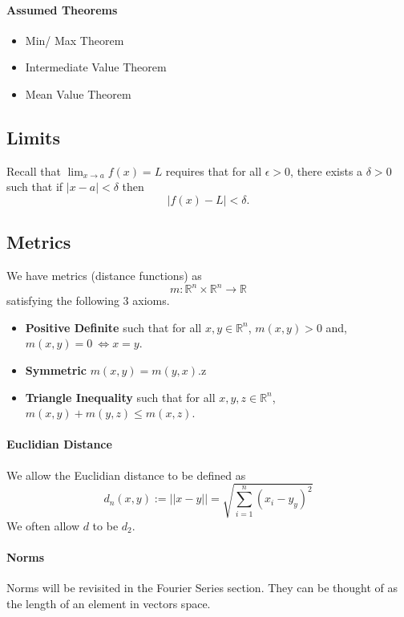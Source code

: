 \documentclass[12pt, letterpaper]{article}
\begin{document}
    \paragraph{Assumed Theorems}
    \begin{itemize}
        \item Min/ Max Theorem
        \item Intermediate Value Theorem
        \item Mean Value Theorem
    \end{itemize}
    
    \subsection{Limits}
    Recall that \(\lim_{x\to a} f(x) = L\) requires that for all
    \(\epsilon > 0\), there exists a \(\delta > 0\) such that
    if \(|x-a| < \delta\)
    then
    \[|f(x) - L|  < \delta.\]
    
    
    
    \subsection{Metrics}
    We have metrics (distance functions) as
    \[m: \mathbb{R}^n\times\mathbb{R}^n \to \mathbb{R}\]
    satisfying the following 3 axioms.
    \begin{itemize}
        \item \textbf{Positive Definite} such that for all \(x,y\in\mathbb{R}^n\),
        \(m(x,y) > 0\) and, \(m(x,y) = 0\ \Leftrightarrow x = y\).
        \item \textbf{Symmetric} \(m(x,y) = m(y, x)\).z
        \item \textbf{Triangle Inequality} such that for all \(x,y,z\in\mathbb{R}^n\),
        \(m(x,y) + m(y, z) \leq m(x, z)\).
    \end{itemize}

    \paragraph{Euclidian Distance}
    We allow the Euclidian distance to be defined as
    \[d_n(x,y) := ||x-y|| = \sqrt{\sum_{i=1}^{n} (x_i - y_y)^2}\]
    We often allow \(d\) to be \(d_2\).

    \paragraph{Norms} Norms will be revisited in the Fourier Series section. They can be thought of as the length of an element in vectors space.
\end{document}
